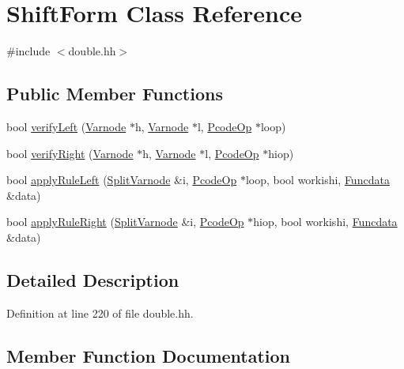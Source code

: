\hypertarget{class_shift_form}{}\section{Shift\+Form Class Reference}
\label{class_shift_form}


{\ttfamily \#include $<$double.\+hh$>$}

\subsection*{Public Member Functions}
\begin{DoxyCompactItemize}
\item 
bool \mbox{\hyperlink{class_shift_form_ae52dfd26b10069bcfab400b66d5b71eb}{verify\+Left}} (\mbox{\hyperlink{class_varnode}{Varnode}} $\ast$h, \mbox{\hyperlink{class_varnode}{Varnode}} $\ast$l, \mbox{\hyperlink{class_pcode_op}{Pcode\+Op}} $\ast$loop)
\item 
bool \mbox{\hyperlink{class_shift_form_ae3063410d8b9584c9f0be3a345e0ee9c}{verify\+Right}} (\mbox{\hyperlink{class_varnode}{Varnode}} $\ast$h, \mbox{\hyperlink{class_varnode}{Varnode}} $\ast$l, \mbox{\hyperlink{class_pcode_op}{Pcode\+Op}} $\ast$hiop)
\item 
bool \mbox{\hyperlink{class_shift_form_ac9a219e016a167cfd28280c8a9cd8520}{apply\+Rule\+Left}} (\mbox{\hyperlink{class_split_varnode}{Split\+Varnode}} \&i, \mbox{\hyperlink{class_pcode_op}{Pcode\+Op}} $\ast$loop, bool workishi, \mbox{\hyperlink{class_funcdata}{Funcdata}} \&data)
\item 
bool \mbox{\hyperlink{class_shift_form_a2e6fa85729963eb0c4ae531edcc38d45}{apply\+Rule\+Right}} (\mbox{\hyperlink{class_split_varnode}{Split\+Varnode}} \&i, \mbox{\hyperlink{class_pcode_op}{Pcode\+Op}} $\ast$hiop, bool workishi, \mbox{\hyperlink{class_funcdata}{Funcdata}} \&data)
\end{DoxyCompactItemize}


\subsection{Detailed Description}


Definition at line 220 of file double.\+hh.



\subsection{Member Function Documentation}
\mbox{\label{class_shift_form_ac9a219e016a167cfd28280c8a9cd8520}} 
